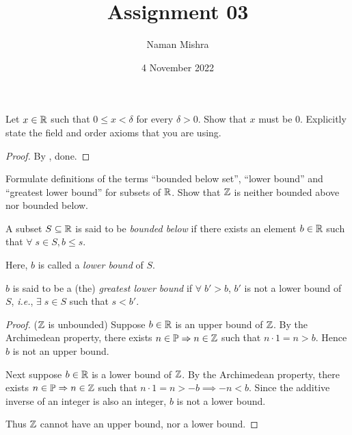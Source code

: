 \documentclass[12pt]{article}
\title{Assignment 03}
\author{Naman Mishra}
\date{4 November 2022}
\begin{document}
\maketitle

\begin{problem}
    Let $x \in \mathbb{R}$ such that $0 \leq x < \delta$ for every $\delta > 0$.
    Show that $x$ must be 0. Explicitly state the field and order axioms that you are using.
\end{problem}
\begin{proof}
    By , done.
\end{proof}
%
%

\begin{problem}
    Formulate  definitions  of  the  terms  ``bounded  below  set'',  ``lower  bound''  and ``greatest lower bound'' for subsets of $\mathbb{R}$.
    Show that $\mathbb{Z}$ is neither bounded above nor bounded below.
\end{problem}
\begin{defn} \label{defn:bounds:lower}
    A subset $S \subseteq \mathbb{R}$ is said to be \emph{bounded below} if there exists an element $b \in \mathbb{R}$ such that $\forall\; s \in S, b \leq s$.

    Here, $b$ is called a \emph{lower bound} of $S$.

    $b$ is said to be a (the) \emph{greatest lower bound} if $\forall\; b' > b$, $b'$ is not a lower bound of $S$, \textit{i.e.}, $\exists\; s \in S$ such that $s < b'$.
\end{defn}
\begin{proof}
    ($\mathbb{Z}$ is unbounded) Suppose $b \in \mathbb{R}$ is an upper bound of $\mathbb{Z}$.
    By the Archimedean property, there exists $n \in \mathbb{P} \Rightarrow n \in \mathbb{Z}$ such that $n\cdot 1 = n > b$.
    Hence $b$ is not an upper bound.
    
    Next suppose $b \in \mathbb{R}$ is a lower bound of $\mathbb{Z}$.
    By the Archimedean property, there exists $n \in \mathbb{P} \Rightarrow n \in \mathbb{Z}$ such that $n \cdot 1 = n > -b \implies -n < b$.
    Since the additive inverse of an integer is also an integer, $b$ is not a lower bound.

    Thus $\mathbb{Z}$ cannot have an upper bound, nor a lower bound.
\end{proof}
\end{document}
